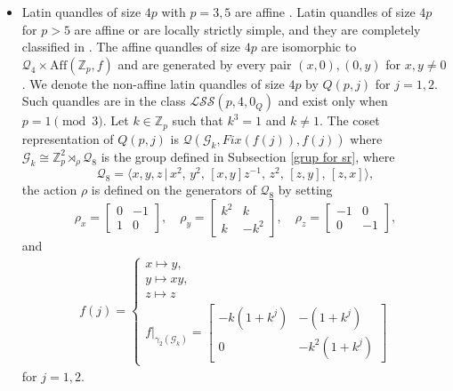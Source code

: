 \documentclass[a4paper, english, 9pt]{amsart}
\theoremstyle{plain}
\theoremstyle{definition}
\def\aff#1{\mathrm{Aff}#1}
\def\Z{\mathbb Z}
\def\LSS{\mathcal{LSS}}
\begin{document}
\begin{itemize}
 \item[(iv)] Latin quandles of size $4p$ with $p=3,5$ are affine \cite{RIG}. 
 Latin quandles of size $4p$ for $p>5$ are affine or are locally strictly simple, and they are completely classified in \cite{LSS}. The affine quandles of size $4p$ are isomorphic to $\mathcal{Q}_4\times \aff(\Z_p,f)$ and are generated by every pair $(x,0),(0,y)$ for $x,y\neq 0$. We denote the non-affine latin quandles of size $4p$ by $Q(p,j)$ for $j=1,2$. Such quandles are in the class $\LSS(p,4,0_Q)$ and exist only when $p=1\pmod{3}$. Let $k\in \Z_p$ such that $k^3=1$ and $k\neq 1$. The coset representation of $Q(p,j)$ is $\mathcal{Q}(\mathcal{G}_k,Fix(f(j)),f(j))$ where $\mathcal{G}_k\cong \Z_p^2\rtimes_\rho \mathcal{Q}_8$ is the group defined in Subsection \ref{grup for sr}, where
 $$\mathcal{Q}_8=\langle x,y,z\,|\, x^2,\, y^2,\, [x,y]z^{-1},\, z^2,\,[z,y],\,[z,x]\rangle,$$
 the action $\rho$ is defined on the generators of $\mathcal{Q}_8$ by setting 
\begin{displaymath}
\rho_x=\begin{bmatrix}
0 & -1\\
1 & 0
\end{bmatrix},\quad
\rho_{y}=\begin{bmatrix}
k^2 & k\\
k & -k^2
\end{bmatrix},\quad \rho_z=\begin{bmatrix}
-1 & 0\\
0 & -1
\end{bmatrix},
\end{displaymath}
 and 
\begin{align}\label{fj}
      f(j)=\begin{cases}
          x\mapsto y,\\
                  y\mapsto xy,\\
                  z\mapsto z\\   f|_{\gamma_2(\mathcal{G}_k)}=\begin{bmatrix}
                      -k(1+k^j) & -(1+k^j)\\
                      0 & -k^2(1+k^j)
                  \end{bmatrix}
                  \end{cases}
\end{align}
 for $j=1,2$.

 
\end{itemize}
\end{document}
